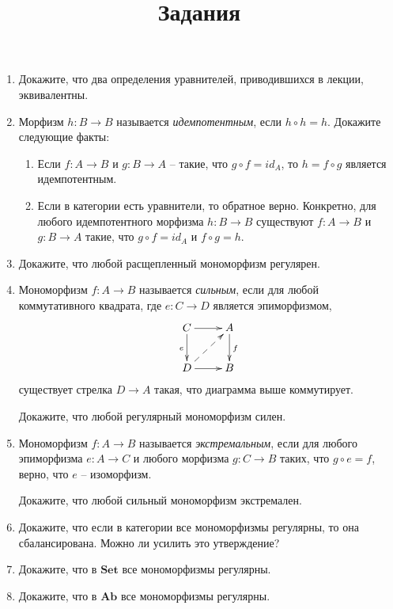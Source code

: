 \documentclass[draft]{article}
\newcommand{\cat}[1]{\mathbf{#1}}
\newcommand{\Set}{\cat{Set}}
\newcommand{\Ab}{\cat{Ab}}
\begin{document}
\title{Задания}
\maketitle

\begin{enumerate}

\item Докажите, что два определения уравнителей, приводившихся в лекции, эквивалентны.

\item Морфизм $h : B \to B$ называется \emph{идемпотентным}, если $h \circ h = h$.
Докажите следующие факты:
\begin{enumerate}
\item Если $f : A \to B$ и $g : B \to A$ -- такие, что $g \circ f = id_A$, то $h = f \circ g$ является идемпотентным.
\item Если в категории есть уравнители, то обратное верно.
Конкретно, для любого идемпотентного морфизма $h : B \to B$ существуют $f : A \to B$ и $g : B \to A$ такие, что $g \circ f = id_A$ и $f \circ g = h$.
\end{enumerate}

\item Докажите, что любой расщепленный мономорфизм регулярен.

\item Мономорфизм $f : A \to B$ называется \emph{сильным}, если для любой коммутативного квадрата, где $e : C \to D$ является эпиморфизмом,
\[ \xymatrix{ C \ar[r] \ar[d]_e      & A \ar[d]^f \\
              D \ar[r] \ar@{-->}[ur] & B
            } \]
существует стрелка $D \to A$ такая, что диаграмма выше коммутирует.

Докажите, что любой регулярный мономорфизм силен.

\item Мономорфизм $f : A \to B$ называется \emph{экстремальным}, если для любого эпиморфизма $e : A \to C$ и любого морфизма $g : C \to B$ таких, что $g \circ e = f$, верно, что $e$ -- изоморфизм.

Докажите, что любой сильный мономорфизм экстремален.

\item Докажите, что если в категории все мономорфизмы регулярны, то она сбалансирована. Можно ли усилить это утверждение?

\item Докажите, что в $\Set$ все мономорфизмы регулярны.

\item Докажите, что в $\Ab$ все мономорфизмы регулярны.


\end{enumerate}
\end{document}
